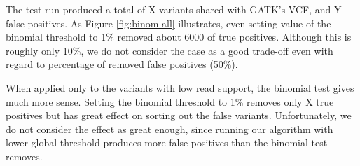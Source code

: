 The test run produced a total of X variants shared with GATK's VCF, and Y false positives. As Figure \ref{fig:binom-all} illustrates, even setting value of the binomial threshold to 1\% removed about 6000 of true positives. Although this is roughly only 10\%, we do not consider the case as a good trade-off even with regard to percentage of removed false positives (50\%). 

When applied only to the variants with low read support, the binomial test gives much more sense. Setting the binomial threshold to 1\% removes only X true positives but has great effect on sorting out the false variants. Unfortunately, we do not consider the effect as great enough, since running our algorithm with lower global threshold produces more false positives than the binomial test removes.
